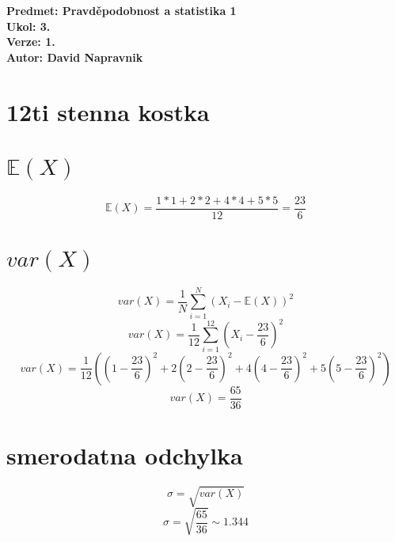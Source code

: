 \documentclass[a4paper]{article}
\begin{document}
\noindent
\textbf{Predmet: Pravděpodobnost a statistika 1}\\
\textbf{Ukol: 3.}\\
\textbf{Verze: 1.}\\
\textbf{Autor: David Napravnik}

\section*{12ti stenna kostka}

\section*{$\mathbb{E}(X)$}
$$\mathbb{E}(X) = \frac{1*1+2*2+4*4+5*5}{12} = \frac{23}{6}$$



\section*{$var(X)$}
$$var(X) = \frac{1}{N} \sum_{i=1}^{N}(X_i-\mathbb{E}(X))^2$$
$$var(X) = \frac{1}{12}\sum_{i=1}^{12}(X_i-\frac{23}{6})^2$$
$$var(X) = \frac{1}{12}((1-\frac{23}{6})^2+2(2-\frac{23}{6})^2+4(4-\frac{23}{6})^2+5(5-\frac{23}{6})^2)$$
$$var(X) = \frac{65}{36}$$





\section*{smerodatna odchylka}
$$\sigma = \sqrt{var(X)}$$
$$\sigma = \sqrt{\frac{65}{36}}\sim 1.344$$
\end{document}
